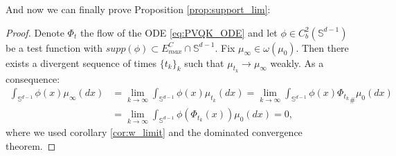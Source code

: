 \documentclass{article}
\numberwithin{theorem}{section}
\begin{document}
And now we can finally prove Proposition \ref{prop:support_lim}:
\begin{proof}
Denote $\Phi_t$ the flow of the ODE \eqref{eq:PVQK_ODE}
and let $\phi\in C^2_b(\mathbb{S}^{d-1})$ be a test function with $supp(\phi)\subset E_{max}^C \cap \mathbb{S}^{d-1}$. Fix $\mu_\infty \in \omega(\mu_0)$. Then there exists a divergent sequence of times $\{t_k\}_k$ such that $\mu_{t_k}\to\mu_\infty$ weakly. As a consequence:
\begin{align*}
\int_{\mathbb{S}^{d-1}} \phi(x) \mu_\infty(dx) &=\lim_{k\to\infty} \int_{\mathbb{S}^{d-1}} \phi(x) \mu_{t_k}(dx)= \lim_{k\to\infty}\int_{\mathbb{S}^{d-1}} \phi(x) {\Phi_{t_k}}_\# \mu_0(dx) \\
&= \lim_{k\to\infty}\int_{\mathbb{S}^{d-1}} \phi(\Phi_{t_k}(x)) \mu_0(dx) = 0,
\end{align*}
where we used corollary \ref{cor:w_limit} and the dominated convergence theorem.
\end{proof}
\end{document}

